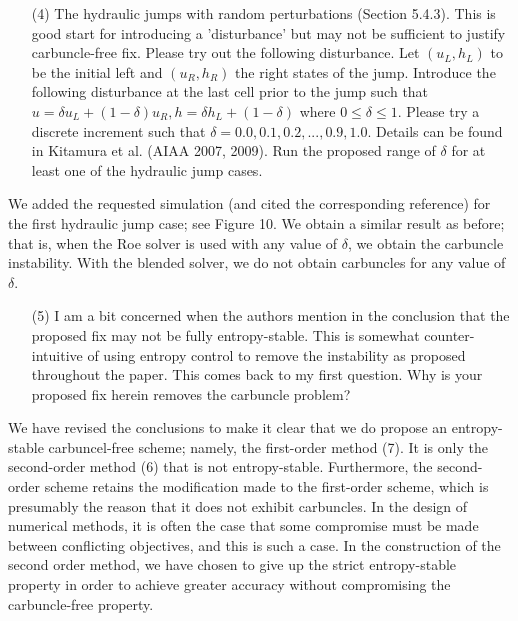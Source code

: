 \documentclass[english,11pt]{article}
\begin{document}
\bigskip
{\color{red}
  \begin{itemize}
  \item[(4)]
    The hydraulic jumps with random perturbations (Section 5.4.3). This is good start for introducing a
    'disturbance' but may not be sufficient to justify carbuncle-free fix. Please try out the following
    disturbance. Let $(u_L, h_L)$ to be the initial left and $(u_R, h_R)$ the right states of the jump. 
    Introduce the following disturbance at the last cell prior to the jump such that 
    $u=\delta { u_L} + (1-\delta)u_R, h=\delta {h_L} + (1-\delta)$ where $0\leq{\delta}\leq{1}$. 
    Please try a discrete increment such that $\delta = 0.0, 0.1, 0.2,...,0.9, 1.0$. 
    Details can be found in Kitamura et al. (AIAA 2007, 2009). Run the proposed range of $\delta$
    for at least one of the hydraulic jump cases.
  \end{itemize}
}
\noindent
We added the requested simulation (and cited the corresponding reference) 
for the first hydraulic jump case; see Figure 10. We obtain a similar result as before; that is, 
when the Roe solver is used with any value of $\delta$, we obtain the carbuncle instability. 
With the blended solver, we do not obtain carbuncles for any value of $\delta$.

\bigskip
{\color{red}
  \begin{itemize}
  \item[(5)]
    I am a bit concerned when the authors mention in the conclusion that the proposed fix may not be fully
    entropy-stable. This is somewhat counter-intuitive of using entropy control to remove the instability as
    proposed throughout the paper. This comes back to my first question. Why is your proposed fix herein
    removes the carbuncle problem?
  \end{itemize}
}
\noindent
We have revised the conclusions to make it clear that we do propose an entropy-stable carbuncel-free scheme;
namely, the first-order method (7).  It is only the second-order method (6) that is not entropy-stable.
Furthermore, the second-order scheme retains the modification made to the first-order scheme, which is
presumably the reason that it does not exhibit carbuncles.
In the design of numerical methods, it is often the case that some compromise must be made between conflicting
objectives, and this is such a case.  In the construction of the second order
method, we have chosen to give up the strict entropy-stable property in order
to achieve greater accuracy without compromising the carbuncle-free property.
\end{document}
